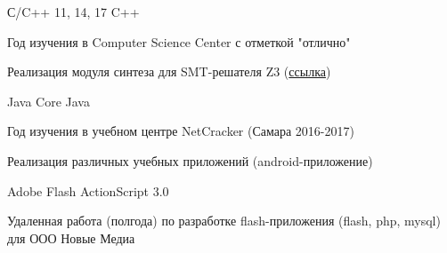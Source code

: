 

\begin{cventries}

  \cventry
    {С/C++ 11, 14, 17} %
    {C++} %
    {} %
    {} %
    {
      \begin{cvitems} %
        \item {Год изучения в Computer Science Center с отметкой "отлично"}
        \item {Реализация модуля синтеза для SMT-решателя Z3 (\href{https://bitbucket.org/vad-mishenev/misynth/src/master/}{ссылка})}
      \end{cvitems}
    }

  \cventry
    {Java Core} %
    {Java} %
    {} %
    {} %
    {
      \begin{cvitems} %
        \item {Год изучения в учебном центре NetCracker (Самара 2016-2017) }
        \item {Реализация  различных учебных приложений (android-приложение)}
      \end{cvitems}
    }
  \cventry
    {Adobe Flash} %
    {ActionScript 3.0} %
    {} %
    {} %
    {
      \begin{cvitems} %
        \item {Удаленная работа (полгода) по разработке flash-приложения (flash, php, mysql) для ООО Новые Медиа}
      \end{cvitems}
    }
\end{cventries}

